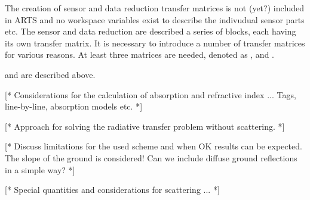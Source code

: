The creation of sensor and data reduction transfer matrices is not
(yet?) included in ARTS and no workspace variables exist to describe
the indivudual sensor parts etc. The sensor and data reduction are
described a series of blocks, each having its own transfer matrix.  It
is necessary to introduce a number of transfer matrices for various
reasons. At least three matrices are needed, denoted as ,
 and .



\label{sec:fm_defs:scandef}


\label{sec:fm_defs:sensorvars}

 and  are described above.


\label{sec:fm_defs:absorption}

[* Considerations for the calculation of absorption and refractive index ...
Tags, line-by-line, absorption models etc. *]



\label{sec:fm_defs:rte}

[* Approach for solving the radiative transfer problem without scattering. *]


\label{sec:fm_defs:groundrefl}

[* Discuss limitations for the used scheme and when OK results can be
expected. The slope of the ground is considered! Can we include
diffuse ground reflections in a simple way? *]



\label{sec:fm_defs:scattering}

[* Special quantities and considerations for scattering ... *]


